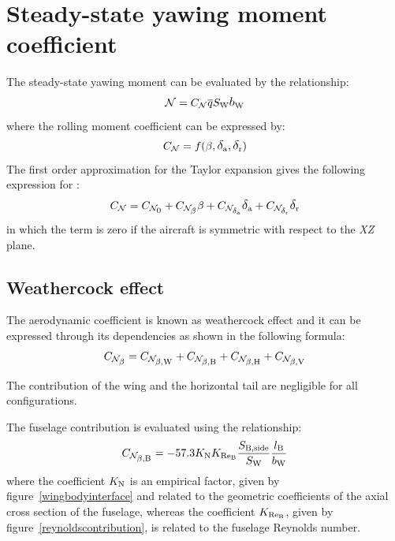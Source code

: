 \section{Steady-state yawing moment coefficient}
\label{sec2.3}

The steady-state yawing moment can be evaluated by the relationship:
\begin{equation}
\label{eq:YawMoment}
\mathcal{N} = \CN \overline{q} \SW \bW
\end{equation}
where the rolling moment coefficient can be expressed by:
\begin{equation}
\CN = f(\beta,\deltaA,\deltaR)
\end{equation}
The first order approximation for the Taylor expansion gives the following expression for \CN :
\begin{equation}
\CN = \CNzeroYaw + \CNbeta \beta + \CNdeltaa \deltaA + \CNdeltar \deltaR
\end{equation}
in which the term \CNzeroYaw is zero if the aircraft is symmetric with respect to the \emph{XZ} plane.

\subsection{Weathercock effect}
\label{subsec2.3.1}

The aerodynamic coefficient \CNbeta is known as weathercock effect and it can be expressed through its dependencies as shown in the following formula:
\begin{equation}
\label{eq:weathercockeffect}
\CNbeta = \CNbetaW + \CNbetaBody + \CNbetaH + \CNbetaV
\end{equation}

The contribution of the wing and the horizontal tail are negligible for all configurations. 

The fuselage contribution is evaluated using the relationship:
\begin{equation}
\label{eq:weathercockBody}
\CNbetaBody = -57.3 K_{\textrm N} K_{\textrm{Re}_\textrm B} \frac{\SBside}{\SW} \frac{\lB}{\bW}
\end{equation}
where the coefficient $K_{\textrm N}$ is an empirical factor, given by figure~\vref{wingbodyinterface} and related to the geometric coefficients of the axial cross section of the fuselage, whereas the coefficient $K_{\textrm{Re}_\textrm B}$, given by figure~\vref{reynoldscontribution}, is related to the fuselage Reynolds number.

